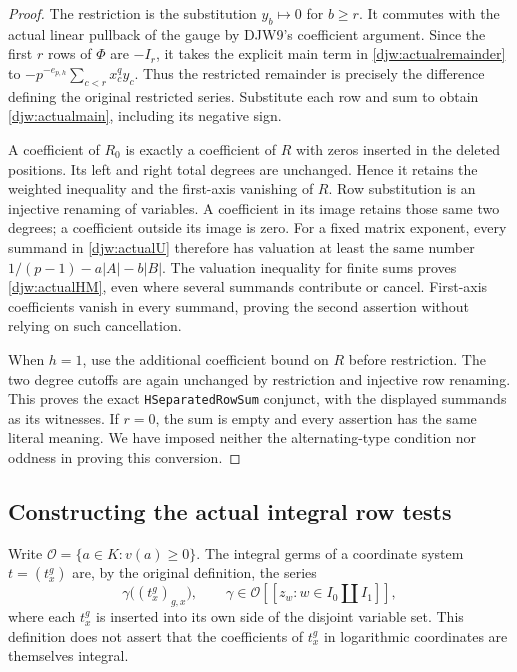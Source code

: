 \documentclass[11pt,a4paper]{article}
\numberwithin{equation}{section}
\theoremstyle{remark}\newtheorem{remark}[theorem]{Remark}
\begin{document}
\begin{proof}
The restriction is the substitution $y_b\mapsto0$ for $b\ge r$.
It commutes with the actual linear pullback of the gauge by DJW9's
coefficient argument.  Since the first $r$ rows of $\Phi$ are
$-I_r$, it takes the explicit main term in
\eqref{djw:actualremainder} to
$-p^{-e_{p,h}}\sum_{c<r}x_c^qy_c$.
Thus the restricted remainder is precisely the difference defining
the original restricted series.  Substitute each row and sum to
obtain \eqref{djw:actualmain}, including its negative sign.

A coefficient of $R_0$ is exactly a coefficient of $R$ with zeros
inserted in the deleted positions.  Its left and right total degrees
are unchanged.  Hence it retains the weighted inequality and
the first-axis vanishing of $R$.  Row substitution is an injective
renaming of variables.  A coefficient in its image retains those
same two degrees; a coefficient outside its image is zero.
For a fixed matrix exponent, every summand in
\eqref{djw:actualU} therefore has valuation at least the same
number $1/(p-1)-a|A|-b|B|$.  The valuation inequality for finite
sums proves \eqref{djw:actualHM}, even where several summands
contribute or cancel.  First-axis coefficients vanish in every
summand, proving the second assertion without relying on such
cancellation.

When $h=1$, use the additional coefficient bound on $R$ before
restriction.  The two degree cutoffs are again unchanged by
restriction and injective row renaming.  This proves the exact
\texttt{HSeparated\allowbreak Row\allowbreak Sum} conjunct, with the displayed summands
as its witnesses.  If $r=0$, the sum is empty and every assertion
has the same literal meaning.  We have imposed neither the
alternating-type condition nor oddness in proving this conversion.
\end{proof}

\subsection{Constructing the actual integral row tests}

Write $\mathcal O=\{a\in K:v(a)\ge0\}$.
The integral germs of a coordinate system $t=(t^g_x)$ are, by
the original definition, the series
\begin{equation}
 \gamma\bigl((t^g_x)_{g,x}\bigr),\qquad
       \gamma\in\mathcal O[[z_w:w\in I_0\amalg I_1]],
 \label{djw:intgerm}
\end{equation}
where each $t^g_x$ is inserted into its own side of the disjoint
variable set.  This definition does not assert that the coefficients
of $t^g_x$ in logarithmic coordinates are themselves integral.
\end{document}
